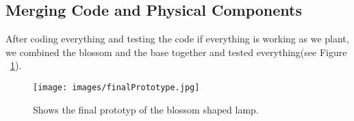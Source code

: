 \documentclass[04_projectProcess.tex]{subfiles}
\begin{document}
    \subsection{Merging Code and Physical Components}
    \begin{flushleft}
        After coding everything and testing the code if everything is working as we plant, we combined
        the blossom and the base together and tested everything(see Figure ~\ref{fig:finalPrototyp}).

        \begin{figure}[h!]
            \centering
            \texttt{[image: images/finalPrototype.jpg]}
            \caption{Shows the final prototyp of the blossom shaped lamp.}
            \label{fig:finalPrototyp}
        \end{figure}
    \end{flushleft}
\end{document}
